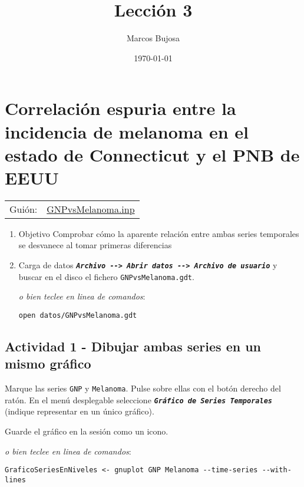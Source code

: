 \documentclass[11pt]{article}
\author{Marcos Bujosa}
\date{\today}
\title{Lección 3}
\begin{document}
\maketitle
\tableofcontents



\section{Correlación espuria entre la incidencia de melanoma en el estado de Connecticut y el PNB de EEUU}
\label{sec:orgf6c5b1e}
\begin{center}
\begin{tabular}{ll}
Guión: & \href{https://github.com/mbujosab/EconometriaAplicada-SRC/blob/main/Practicas/PracticasGretl/pub/scripts/GNPvsMelanoma.inp}{GNPvsMelanoma.inp}\\[0pt]
\end{tabular}
\end{center}

\begin{enumerate}
\item Objetivo
\label{sec:org3384657}
Comprobar cómo la aparente relación entre ambas series temporales se
desvanece al tomar primeras diferencias

\item Carga de datos
\label{sec:orgf5c07f6}
\textbf{\emph{\texttt{Archivo -{}-{}> Abrir datos -{}-{}> Archivo de usuario}}} y buscar en el
disco el fichero \texttt{GNPvsMelanoma.gdt}.

{\vspace{0pt} \footnotesize \color{gray!70!black}
\emph{o bien teclee en linea de comandos}:
\begin{verbatim}
open datos/GNPvsMelanoma.gdt
\end{verbatim}
}
\end{enumerate}

\subsection{Actividad 1 - Dibujar ambas series en un mismo gráfico}
\label{sec:orgf63e76f}
Marque las series \texttt{GNP} y \texttt{Melanoma}. Pulse sobre ellas con el botón
derecho del ratón. En el menú desplegable seleccione \textbf{\emph{\texttt{Gráfico de
Series Temporales}}} (indique representar en un único gráfico).

Guarde el gráfico en la sesión como un icono.

{\vspace{1pt} \footnotesize \color{gray!70!black}
\emph{o bien teclee en linea de comandos}:
\begin{verbatim}
GraficoSeriesEnNiveles <- gnuplot GNP Melanoma --time-series --with-lines
\end{verbatim}
}
\end{document}

